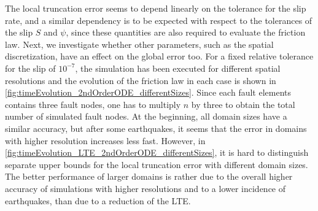The local truncation error seems to depend linearly on the tolerance for the slip rate, and a similar dependency is to be expected with respect to the tolerances of the slip $S$ and $\psi$, since these quantities are also required to evaluate the friction law. Next, we investigate whether other parameters, such as the spatial discretization, have an effect on the global error too. For a fixed relative tolerance for the slip of $10^{-7}$, the simulation has been executed for different spatial resolutions and the evolution of the friction law in each case is shown in \autoref{fig:timeEvolution_2ndOrderODE_differentSizes}. Since each fault elements contains three fault nodes, one has to multiply $n$ by three to obtain the total number of simulated fault nodes. At the beginning, all domain sizes have a similar accuracy, but after some earthquakes, it seems that the error in domains with higher resolution increases less fast. However, in \autoref{fig:timeEvolution_LTE_2ndOrderODE_differentSizes}, it is hard to distinguish separate upper bounds for the local truncation error with different domain sizes. The better performance of larger domains is rather due to the overall higher accuracy of simulations with higher resolutions and to a lower incidence of earthquakes, than due to a reduction of the LTE. 

